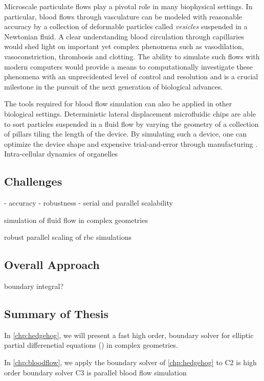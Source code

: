 Microscale particulate flows play a pivotal role in many biophysical settings.
In particular, blood flows through vasculature can be modeled with reasonable accuracy by a collection of deformable particles called \textit{vesicles} suspended in a Newtonian fluid.
A clear understanding blood circulation through capillaries would shed light on important yet complex phenomena such as vasodilation, vasoconstriction, thrombosis and clotting.
The ability to simulate such flows with modern computers would provide a means to computationally investigate these phenomena with an unprecidented level of control and resolution and is a crucial milestone in the pursuit of the next generation of biological advances.

The tools required for blood flow simulation can also be applied in other biological settings.
Deterministic lateral displacement microfluidic chips are able to sort particles suspended in a fluid flow by varying the geometry of a collection of pillars tiling the length of the device.
By simulating such a device, one can optimize the device shape and expensive trial-and-error through manufacturing \cite{kabacaouglu2019sorting}.
Intra-cellular dynamics of organelles \cite{nazockdast2017cytoplasmic}

\subsection{Challenges}
 - accuracy
 - robustness
 - serial and parallel scalability

simulation of fluid flow in complex geometries

robust parallel scaling of rbc simulations
\subsection{Overall Approach}
boundary integral?
\subsection{Summary of Thesis}
In \cref{chp:hedgehog}, we will present a fast high order, boundary solver for elliptic partial differenetial equations (\pdes) in \threed complex geometries. 

In \cref{chp:bloodflow}, we apply the boundary solver of \cref{chp:hedgehog} to 
C2 is high order boundary solver
C3 is parallel blood flow simulation
